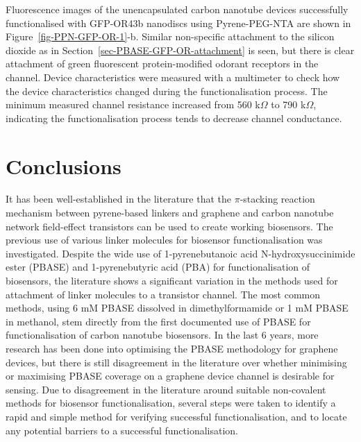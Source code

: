 \documentclass[
  a4paper,
]{scrbook}
\begin{document}
Fluorescence images of the unencapsulated carbon nanotube devices
successfully functionalised with GFP-OR43b nanodiscs using
Pyrene-PEG-NTA are shown in Figure~\ref{fig-PPN-GFP-OR-1}-b. Similar
non-specific attachment to the silicon dioxide as in
Section~\ref{sec-PBASE-GFP-OR-attachment} is seen, but there is clear
attachment of green fluorescent protein-modified odorant receptors in
the channel. Device characteristics were measured with a multimeter to
check how the device characteristics changed during the
functionalisation process. The minimum measured channel resistance
increased from 560 k\(\Omega\) to 790 k\(\Omega\), indicating the
functionalisation process tends to decrease channel conductance.

\hypertarget{sec-conclusions}{%
\section{Conclusions}\label{sec-conclusions}}

It has been well-established in the literature that the \(\pi\)-stacking
reaction mechanism between pyrene-based linkers and graphene and carbon
nanotube network field-effect transistors can be used to create working
biosensors. The previous use of various linker molecules for biosensor
functionalisation was investigated. Despite the wide use of
1-pyrenebutanoic acid N-hydroxysuccinimide ester (PBASE) and
1-pyrenebutyric acid (PBA) for functionalisation of biosensors, the
literature shows a significant variation in the methods used for
attachment of linker molecules to a transistor channel. The most common
methods, using 6 mM PBASE dissolved in dimethylformamide or 1 mM PBASE
in methanol, stem directly from the first documented use of PBASE for
functionalisation of carbon nanotube biosensors. In the last 6 years,
more research has been done into optimising the PBASE methodology for
graphene devices, but there is still disagreement in the literature over
whether minimising or maximising PBASE coverage on a graphene device
channel is desirable for sensing. Due to disagreement in the literature
around suitable non-covalent methods for biosensor functionalisation,
several steps were taken to identify a rapid and simple method for
verifying successful functionalisation, and to locate any potential
barriers to a successful functionalisation.
\end{document}
